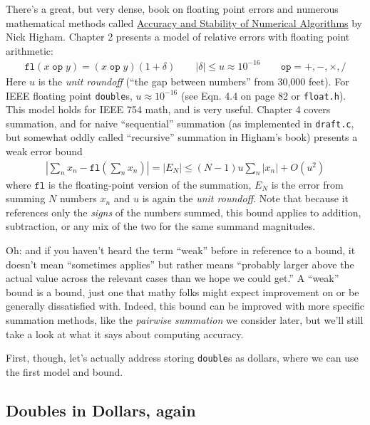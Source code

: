 \documentclass[11pt, oneside]{amsart}   	%
\begin{document}
There's a great, but very dense, book on floating point errors and numerous mathematical methods called \href{https://www.google.com/books/edition/Accuracy_and_Stability_of_Numerical_Algo/5tv3HdF-0N8C?hl=en&gbpv=1&pr\texttt{int}sec=frontcover}{Accuracy and Stability of Numerical Algorithms} by Nick Higham. Chapter 2 presents a model of relative errors with floating point arithmetic: 
\begin{align*}
    \texttt{fl}(x \; \texttt{op} \; y) = ( x \; \texttt{op} \; y ) ( 1 + \delta )
    \quad\quad
    |\delta| \leq u \approx 10^{-16}
    \quad\quad
    \texttt{op} = +,-,\times,/
\end{align*}
Here $u$ is the {\em unit roundoff} (``the gap between numbers'' from 30,000 feet). For IEEE floating point \texttt{double}s, $u \approx 10^{-16}$ (see Eqn. 4.4 on page 82 or \texttt{float.h}). This model holds for IEEE 754 math, and is very useful. Chapter 4 covers summation, and for naive ``sequential'' summation (as implemented in \texttt{draft.c}, but somewhat oddly called ``recursive'' summation in Higham's book) presents a weak error bound
\begin{align*}
    \left| \sum_n x_n - \texttt{fl}\left(\sum_n x_n\right) \right| = | E_N | \leq (N-1)u \sum_n | x_n | + O(u^2)
\end{align*}
where $\texttt{fl}$ is the floating-point version of the summation, $E_N$ is the error from summing $N$ numbers $x_n$ and $u$ is again the {\em unit roundoff}. Note that because it references only the {\em signs} of the numbers summed, this bound applies to addition, subtraction, or any mix of the two for the same summand magnitudes. 

Oh: and if you haven't heard the term ``weak'' before in reference to a bound, it doesn't mean ``sometimes applies'' but rather means ``probably larger above the actual value across the relevant cases than we hope we could get.'' A ``weak'' bound is a bound, just one that mathy folks might expect improvement on or be generally dissatisfied with. Indeed, this bound can be improved with more specific summation methods, like the {\em pairwise summation} we consider later, but we'll still take a look at what it says about computing accuracy. 

First, though, let's actually address storing \texttt{double}s as dollars, where we can use the first model and bound. 

\subsection{Doubles in Dollars, again}
\end{document}

